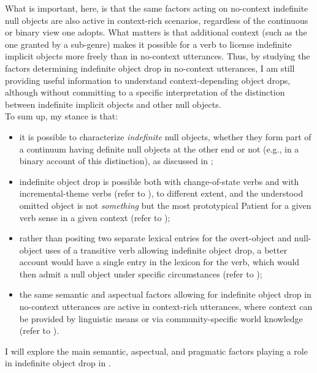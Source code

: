 What is important, here, is that the same factors acting on no-context indefinite null objects are also active in context-rich scenarios, regardless of the continuous or binary view one adopts. What matters is that additional context (such as the one granted by a sub-genre) makes it possible for a verb to license indefinite implicit objects more freely than in no-context utterances. Thus, by studying the factors determining indefinite object drop in no-context utterances, I am still providing useful information to understand context-depending object drops, although without committing to a specific interpretation of the distinction between indefinite implicit objects and other null objects.\\
To sum up, my stance is that:
\begin{itemize}
    \item it is possible to characterize \textit{indefinite} null objects, whether they form part of a continuum having definite null objects at the other end or not (e.g., in a binary account of this distinction), as discussed in ;
    \item indefinite object drop is possible both with change-of-state verbs and with incremental-theme verbs (refer to ), to different extent, and the understood omitted object is not \textit{something} but the most prototypical Patient for a given verb sense in a given context (refer to );
    \item rather than positing two separate lexical entries for the overt-object and null-object uses of a transitive verb allowing indefinite object drop, a better account would have a single entry in the lexicon for the verb, which would then admit a null object under specific circumstances (refer to );
    \item the same semantic and aspectual factors allowing for indefinite object drop in no-context utterances are active in context-rich utterances, where context can be provided by linguistic means or via community-specific world knowledge (refer to ).
\end{itemize}

I will explore the main semantic, aspectual, and pragmatic factors playing a role in indefinite object drop in .